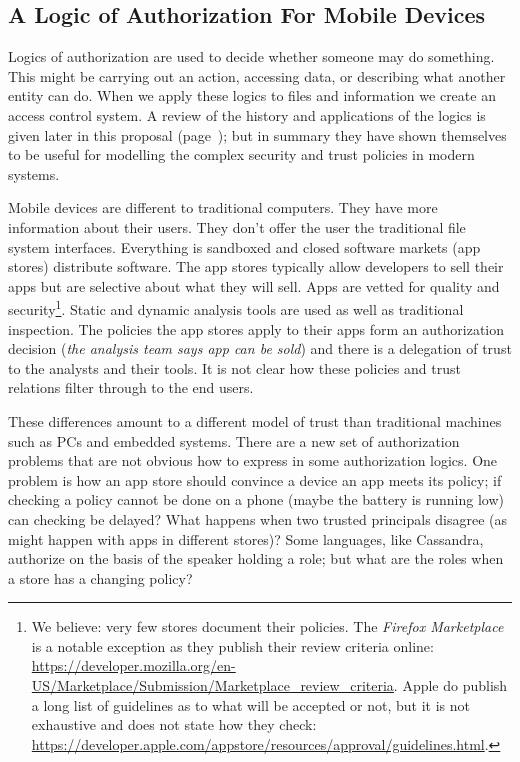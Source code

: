 \documentclass[a4paper]{article}
\begin{document}
\subsection{A Logic of Authorization For Mobile Devices}

Logics of authorization are used to decide whether someone may do something.
This might be carrying out an action, accessing data, or describing what another
entity can do. When we apply these logics to files and information we create an
access control system. A review of the history and applications of
the logics is given later in this proposal (page~\pageref{sec:pollang}); but in
summary they have shown themselves to be useful for modelling the
complex security and trust policies in modern systems.

Mobile devices are different to traditional computers. They have more
information about their users. They don't offer the user the traditional file
system interfaces. Everything is sandboxed and closed software markets (app
stores) distribute software.  The app stores typically allow developers to sell
their apps but are selective about what they will sell.  Apps are vetted for
quality and security\footnote{We believe: very few stores document their
  policies.  The \emph{Firefox Marketplace} is a notable exception as they
  publish their review criteria online:
  \url{https://developer.mozilla.org/en-US/Marketplace/Submission/Marketplace_review_criteria}.
Apple do publish a long list of guidelines as to what will be accepted or not,
but it is not exhaustive and does not state how they check:
\url{https://developer.apple.com/appstore/resources/approval/guidelines.html}. }.
  Static and dynamic analysis tools are used as well as traditional inspection.
  The policies the app stores apply to their apps form an authorization decision
  (\emph{the analysis team says app can be sold}) and there is a delegation of
  trust to the analysts and their tools. It is not clear how these policies and
  trust relations filter through to the end users.

These differences amount to a different model of trust than traditional machines
such as PCs and embedded systems. There are a new set of authorization problems
that are not obvious how to express in some authorization logics.  One problem
is how an app store should convince a device an app meets its policy; if
checking a policy cannot be done on a phone (maybe the battery is running low)
can checking be delayed?  What happens when two trusted principals disagree (as
might happen with apps in different stores)?  Some languages, like
Cassandra\cite{Becker:2004fi}, authorize on the basis of the speaker holding a
role; but what are the roles when a store has a changing policy?  
\end{document}
